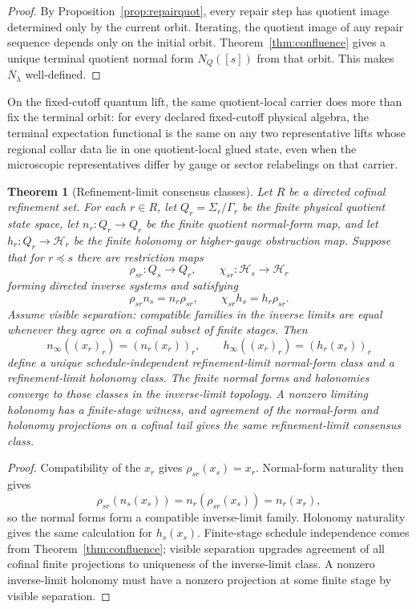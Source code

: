 \documentclass[11pt]{article}
\newtheorem{theorem}{Theorem}[section]
\begin{document}
\begin{proof}
By Proposition~\ref{prop:repairquot}, every repair step has quotient image determined only by the
current orbit. Iterating, the quotient image of any repair sequence depends only on the initial
orbit. Theorem~\ref{thm:confluence} gives a unique terminal quotient normal form \(N_Q([s])\)
from that orbit. This makes \(\overline N_\lambda\) well-defined.
\end{proof}

On the fixed-cutoff quantum lift, the same quotient-local carrier does more than fix the terminal
orbit: for every declared fixed-cutoff physical algebra, the terminal expectation functional is
the same on any two representative lifts whose regional collar data lie in one quotient-local
glued state, even when the microscopic representatives differ by gauge or sector relabelings on
that carrier.

\begin{theorem}[Refinement-limit consensus classes]\label{thm:consensusrefinement}
Let \(R\) be a directed cofinal refinement set. For each \(r\in R\), let
\(Q_r=\Sigma_r/\Gamma_r\) be the finite physical quotient state space, let
\(n_r:Q_r\to Q_r\) be the finite quotient normal-form map, and let
\(h_r:Q_r\to\mathcal H_r\) be the finite holonomy or higher-gauge obstruction map. Suppose that
for \(r\preceq s\) there are restriction maps
\[
\rho_{sr}:Q_s\to Q_r,\qquad \chi_{sr}:\mathcal H_s\to\mathcal H_r
\]
forming directed inverse systems and satisfying
\[
\rho_{sr}n_s=n_r\rho_{sr},
\qquad
\chi_{sr}h_s=h_r\rho_{sr}.
\]
Assume visible separation: compatible families in the inverse limits are equal whenever they
agree on a cofinal subset of finite stages. Then
\[
n_\infty((x_r)_r)=(n_r(x_r))_r,
\qquad
h_\infty((x_r)_r)=(h_r(x_r))_r
\]
define a unique schedule-independent refinement-limit normal-form class and a refinement-limit
holonomy class. The finite normal forms and holonomies converge to those classes in the
inverse-limit topology. A nonzero limiting holonomy has a finite-stage witness, and agreement of
the normal-form and holonomy projections on a cofinal tail gives the same refinement-limit
consensus class.
\end{theorem}

\begin{proof}
Compatibility of the \(x_r\) gives \(\rho_{sr}(x_s)=x_r\). Normal-form naturality then gives
\[
\rho_{sr}(n_s(x_s))=n_r(\rho_{sr}(x_s))=n_r(x_r),
\]
so the normal forms form a compatible inverse-limit family. Holonomy naturality gives the same
calculation for \(h_s(x_s)\). Finite-stage schedule independence comes from
Theorem~\ref{thm:confluence}; visible separation upgrades agreement of all cofinal finite
projections to uniqueness of the inverse-limit class. A nonzero inverse-limit holonomy must have
a nonzero projection at some finite stage by visible separation.
\end{proof}
\end{document}
